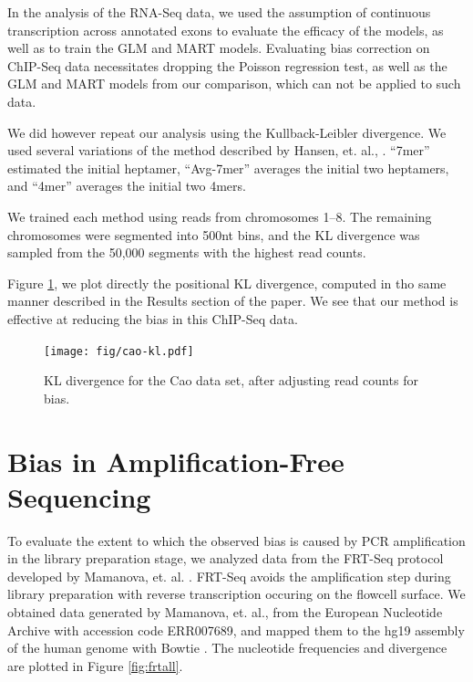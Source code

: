 \documentclass[letterpaper]{article}
\begin{document}
In the analysis of the RNA-Seq data, we used the assumption of continuous
transcription across annotated exons to evaluate the efficacy of the models, as
well as to train the GLM and MART models. Evaluating bias correction on ChIP-Seq
data necessitates dropping the Poisson regression test, as well as the GLM and
MART models from our comparison, which can not be applied to such data.

We did however repeat our analysis using the Kullback-Leibler divergence.
We used several variations of the method described by Hansen, et. al.,
\cite{Hansen2010}. ``7mer'' estimated the initial heptamer, ``Avg-7mer''
averages the initial two heptamers, and ``4mer'' averages the initial two 4mers.

We trained each method using reads from chromosomes 1--8. The
remaining chromosomes were segmented into 500nt bins, and the KL divergence was
sampled from the 50,000 segments with the highest read counts.

Figure \ref{fig:caokl}, we plot directly the positional KL divergence, computed
in tho same manner described in the Results section of the paper.  We see that
our method is effective at reducing the bias in this ChIP-Seq data.

\begin{figure}[H]
\begin{center}
\texttt{[image: fig/cao-kl.pdf]}
\end{center}
\caption{KL divergence for the Cao data set, after adjusting read counts for
bias.}
\label{fig:caokl}
\end{figure}




\section{Bias in Amplification-Free Sequencing}

To evaluate the extent to which the observed bias is caused by PCR amplification
in the library preparation stage, we analyzed data from the FRT-Seq protocol
developed by Mamanova, et. al. \cite{Mamanova2010}. FRT-Seq avoids the
amplification step during library preparation with reverse transcription
occuring on the flowcell surface. We obtained data generated by Mamanova, et.
al., from the European Nucleotide Archive with accession code ERR007689, and
mapped them to the hg19 assembly of the human genome with Bowtie
\cite{Langmead2009}. The nucleotide frequencies and divergence are plotted
in Figure \ref{fig:frtall}.
\end{document}
